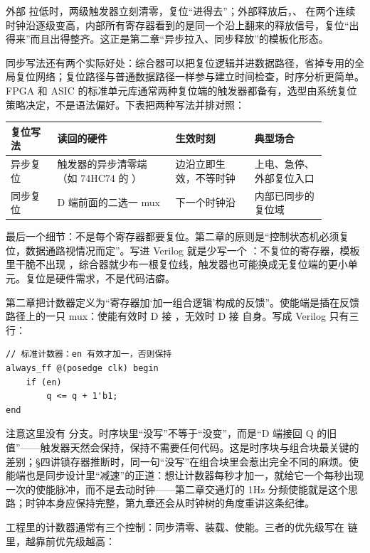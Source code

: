 外部  拉低时，两级触发器立刻清零，复位“进得去”；外部释放后，、 在两个连续时钟沿逐级变高，内部所有寄存器看到的是同一个沿上翻来的释放信号，复位“出得来”而且出得整齐。这正是第二章“异步拉入、同步释放”的模板化形态。

同步写法还有两个实际好处：综合器可以把复位逻辑并进数据路径，省掉专用的全局复位网络；复位路径与普通数据路径一样参与建立时间检查，时序分析更简单。FPGA 和 ASIC 的标准单元库通常两种复位端的触发器都备有，选型由系统复位策略决定，不是语法偏好。下表把两种写法并排对照：

\begin{longtable}{L{0.13\linewidth}L{0.33\linewidth}L{0.22\linewidth}L{0.20\linewidth}}
\toprule
复位写法 & 读回的硬件 & 生效时刻 & 典型场合 \\
\midrule
异步复位 & 触发器的异步清零端（如 74HC74 的 ） &  边沿立即生效，不等时钟 & 上电、急停、外部复位入口 \\
同步复位 & D 端前面的二选一 mux & 下一个时钟沿 & 内部已同步的复位域 \\
\bottomrule
\end{longtable}

最后一个细节：不是每个寄存器都要复位。第二章的原则是“控制状态机必须复位，数据通路视情况而定”。写进 Verilog 就是少写一个 ：不复位的寄存器，模板里干脆不出现 ，综合器就少布一根复位线，触发器也可能换成无复位端的更小单元。复位是硬件需求，不是代码洁癖。


第二章把计数器定义为“寄存器加‘加一组合逻辑’构成的反馈”。使能端是插在反馈路径上的一只 mux：使能有效时 D 接 ，无效时 D 接  自身。写成 Verilog 只有三行：

\begin{lstlisting}
// 标准计数器：en 有效才加一，否则保持
always_ff @(posedge clk) begin
    if (en)
        q <= q + 1'b1;
end
\end{lstlisting}

注意这里没有  分支。时序块里“没写”不等于“没变”，而是“D 端接回 Q 的旧值”——触发器天然会保持，保持不需要任何代码。这是时序块与组合块最关键的差别；§四讲锁存器推断时，同一句“没写”在组合块里会惹出完全不同的麻烦。使能端也是同步设计里“减速”的正道：想让计数器每秒才加一，就给它一个每秒出现一次的使能脉冲，而不是去动时钟——第二章交通灯的 1Hz 分频使能就是这个思路；时钟本身应保持完整，第九章还会从时钟树的角度重讲这条纪律。

工程里的计数器通常有三个控制：同步清零、装载、使能。三者的优先级写在  链里，越靠前优先级越高：

